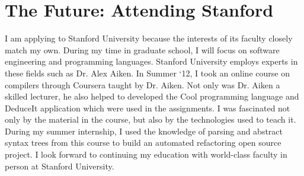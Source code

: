 \section*{The Future: Attending Stanford}
I am applying to Stanford University because the interests of its faculty closely match my own. During my time in graduate school, I will focus on software engineering and programming languages. Stanford University employs experts in these fields such as Dr. Alex Aiken. In Summer ‘12, I took an online course on compilers through Coursera taught by Dr. Aiken. Not only was Dr. Aiken a skilled lecturer, he also helped to developed the Cool programming language and DeduceIt application which were used in the assignments. I was fascinated not only by the material in the course, but also by the technologies used to teach it. During my summer internship, I used the knowledge of parsing and abstract syntax trees from this course to build an automated refactoring open source project. I look forward to continuing my education with world-class faculty in person at Stanford University.